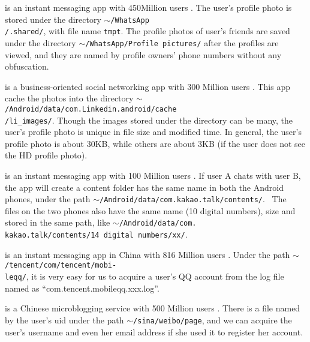 \documentclass{sig-alternate}
\begin{document}
\vspace{2pt} is an instant messaging app with 450Million users \cite{10MessagingApps}. The user's profile photo is stored under the directory \texttt{$\sim$/WhatsApp\\/.shared/}, with file name \texttt{tmpt}. The profile photos of user's friends are saved under the directory \texttt{$\sim$/WhatsApp/Profile pictures/} after the profiles are viewed, and they are named by profile owners' phone numbers without any obfuscation.



\vspace{2pt} is a business-oriented social networking app with 300 Million users \cite{Linkedinuser}.  This app cache the photos into the directory \texttt{$\sim$/Android/data/com.Linkedin.android/cache\\/li\_images/}.  Though the images stored under the directory can be many, the user's profile photo is unique in file size and modified time. In general, the user's profile photo is about 30KB, while others are about 3KB (if the user does not see the HD profile photo).


\vspace{2pt} is an instant messaging app with 100 Million users \cite{10MessagingApps}.  If user A chats with user B, the app will create a content folder has the same name in both the Android phones, under the path \texttt{$\sim$/Android/data/com.kakao.talk/contents/}. ~The\\ files on the two phones also have the same name (10 digital numbers), size and stored in the same path, like \texttt{$\sim$/Android/data/com.\\kakao.talk/contents/14 digital numbers/xx/}.



\vspace{2pt} is an instant messaging app in China with 816 Million users \cite{allusers}.  Under the path \texttt{$\sim$/tencent/com/tencent/mobi-\\leqq/}, it is very easy for us to acquire a user's  QQ account from the log file named as ``com.tencent.mobileqq.xxx.log''.


\vspace{2pt} is a Chinese microblogging service with 500 Million users \cite{Weibouser}. There is a file named by the user's uid under the path \texttt{$\sim$/sina/weibo/page}, and we can acquire the user's username and even her email address if she used it to register her account.
\end{document}
